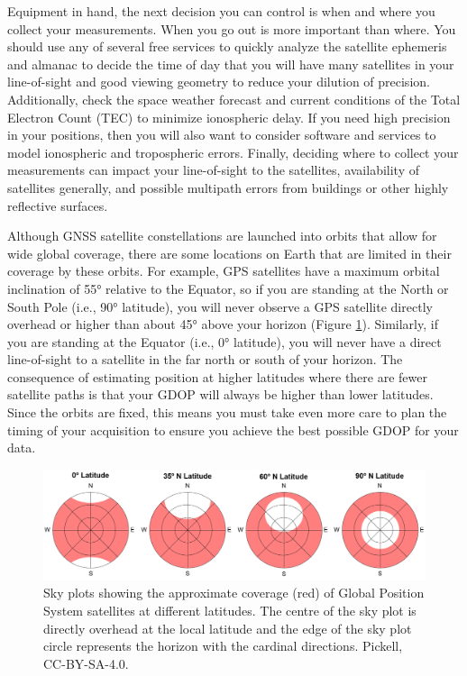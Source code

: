\documentclass[
]{book}
\begin{document}
Equipment in hand, the next decision you can control is when and where you collect your measurements. When you go out is more important than where. You should use any of several free services to quickly analyze the satellite ephemeris and almanac to decide the time of day that you will have many satellites in your line-of-sight and good viewing geometry to reduce your dilution of precision. Additionally, check the space weather forecast and current conditions of the Total Electron Count (TEC) to minimize ionospheric delay. If you need high precision in your positions, then you will also want to consider software and services to model ionospheric and tropospheric errors. Finally, deciding where to collect your measurements can impact your line-of-sight to the satellites, availability of satellites generally, and possible multipath errors from buildings or other highly reflective surfaces.

Although GNSS satellite constellations are launched into orbits that allow for wide global coverage, there are some locations on Earth that are limited in their coverage by these orbits. For example, GPS satellites have a maximum orbital inclination of 55° relative to the Equator, so if you are standing at the North or South Pole (i.e., 90° latitude), you will never observe a GPS satellite directly overhead or higher than about 45° above your horizon (Figure \ref{fig:14-GNSS-satellite-coverage-by-latitude}). Similarly, if you are standing at the Equator (i.e., 0° latitude), you will never have a direct line-of-sight to a satellite in the far north or south of your horizon. The consequence of estimating position at higher latitudes where there are fewer satellite paths is that your GDOP will always be higher than lower latitudes. Since the orbits are fixed, this means you must take even more care to plan the timing of your acquisition to ensure you achieve the best possible GDOP for your data.

\begin{figure}
\includegraphics[width=1\linewidth]{images/14-GNSS-satellite-coverage-by-latitude} \caption{Sky plots showing the approximate coverage (red) of Global Position System satellites at different latitudes. The centre of the sky plot is directly overhead at the local latitude and the edge of the sky plot circle represents the horizon with the cardinal directions. Pickell, CC-BY-SA-4.0.}\label{fig:14-GNSS-satellite-coverage-by-latitude}
\end{figure}
\end{document}
